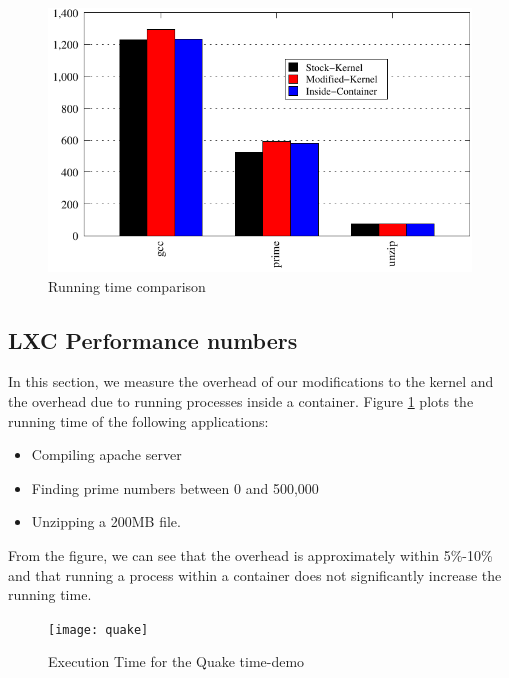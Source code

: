 \begin{figure}[tbh]
\centering
\includegraphics[width=1.0\columnwidth]{perf}
\caption{Running time comparison}
\label{fig:perf}
\end{figure}

\subsection{LXC Performance numbers}
In this section, we measure the overhead of our modifications to the kernel and the overhead due to running processes inside a container. Figure \ref{fig:perf} plots the running time of the following applications:
\begin{itemize}
    \item Compiling apache server
    \item Finding prime numbers between 0 and 500,000
    \item Unzipping a 200MB file.
\end{itemize}
From the figure, we can see that the overhead is approximately within 5\%-10\% and that running a process within a container does not significantly increase the running time.


\begin{figure}[tbh]
\centering
\texttt{[image: quake]}
\caption{Execution Time for the Quake time-demo}
\label{fig:Quake}
\end{figure}

